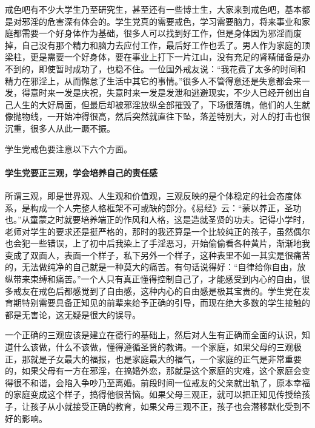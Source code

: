 戒色吧有不少大学生乃至研究生，甚至还有一些博士生，大家来到戒色吧，基本都是对邪淫的危害深有体会的。学生党真的需要戒色，学习需要脑力，将来事业和家庭都需要一个好身体作为基础，很多人可以找到好工作，但是身体因为邪淫而废掉，自己没有那个精力和脑力去应付工作，最后好工作也丢了。男人作为家庭的顶梁柱，更是需要一个好身体，要在事业上打下一片江山，没有充足的肾精储备是办不到的，即使暂时成功了，也稳不住。一位国外戒友说：“我花费了太多的时间和精力在邪淫上，从而懈怠了生活中其它的事情。”很多人不管得意还是失意都会来一发，得意时来一发是庆祝，失意时来一发是发泄和逃避现实，不少人已经开创出自己人生的大好局面，但最后却被邪淫放纵全部摧毁了，下场很落魄，他们的人生就像抛物线，一开始冲得很高，然后突然就直往下坠，落差特别大，对人的打击也很沉重，很多人从此一蹶不振。

学生党戒色要注意以下六个方面。

\paragraph{学生党要正三观，学会培养自己的责任感}

所谓三观，即是世界观、人生观和价值观，三观反映的是个体稳定的社会态度体系，是构成一个人完整人格框架不可或缺的部分。《易经》云：“蒙以养正，圣功也。”从童蒙之时就要培养端正的作风和人格，这是造就圣贤的功夫。记得小学时，老师对学生的要求还是挺严格的，那时的我还算是一个比较纯正的孩子，虽然偶尔也会犯一些错误，上了初中后我染上了手淫恶习，开始偷偷看各种黄片，渐渐地我变成了双面人，表面一个样子，私下另外一个样子，这种表里不如一其实是很痛苦的，无法做纯净的自己就是一种莫大的痛苦。有句话说得好：“自律给你自由，放纵带来束缚和痛苦。”一个人只有真正懂得控制自己了，才能感受到内心的自由，很多戒友在戒色后都感觉到了自由感，这种内心的自由感是极其宝贵的。学生党在发育期特别需要具备正知见的前辈来给予正确的引导，而现在绝大多数的学生接触的都是无害论，这无疑是很大的误导。

一个正确的三观应该是建立在德行的基础上，然后对人生有正确而全面的认识，知道什么该做，什么不该做，懂得遵循圣贤的教诲。一个家庭，如果父母的三观极正，那就是子女最大的福报，也是家庭最大的福气，一个家庭的正气是非常重要的，如果父母有一方在邪淫，在搞婚外恋，那就是这个家庭的灾难，这个家庭会变得很不和谐，会陷入争吵乃至离婚。前段时间一位戒友的父亲就出轨了，原本幸福的家庭变成这个样子，搞得他很苦恼。如果父母三观正，就可以把正知见传授给孩子，让孩子从小就接受正确的教育，如果父母三观不正，孩子也会潜移默化受到不好的影响。

